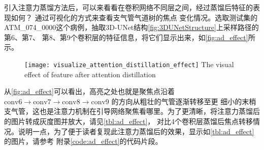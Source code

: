 引入注意力蒸馏方法后，可以来看看在卷积网络不同层之间，经过蒸馏后特征的表现如何？ 通过可视化的方式来查看支气管气道树的焦点
变化情况。选取测试集的ATM\_074\_0000这个病例，抽取3D-UNet结构\autoref{fig:3DUNetStructure}上采样路径的第6、第7、
第8、第9个卷积层的特征信息，将它们显示出来，如\autoref{fig:ad_effect}所示。
\begin{figure}[ht]
    \centering
    \texttt{[image: visualize\_attention\_distillation\_effect]}
        {The visual effect of feature after attention distillation}
    \label{fig:ad_effect}
\end{figure}
从\autoref{fig:ad_effect}可以看出，高亮之处也就是聚焦点沿着$\text{conv6} \rightarrow \text{conv7} \rightarrow \text{conv8} \rightarrow \text{conv9}$
的方向从粗壮的气管逐渐转移至更
细小的末梢支气管，这也是注意力机制在引导网络聚焦看哪里。为了更清晰，将注意力蒸馏后的图片转成灰度图并放大，请见\autoref{tbl:ad_effect}，
对比4个卷积层蒸馏后焦点转移情况。说明一点，为了便于读者复现此注意力蒸馏后的效果，显示如\autoref{tbl:ad_effect}的图片，请参考
附录\ref{code:ad_effect}的代码片段。

